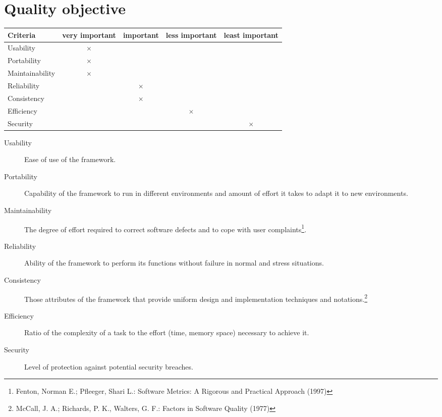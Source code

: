 \section{Quality objective}

\begin{tabular}{lcccc}
\hline
\textbf{Criteria} & \textbf{very important} & \textbf{important} & \textbf{less important} & \textbf{least important} \\
	\hline
	Usability & $\times$ & & & \\
	Portability & $\times$ & & & \\
	Maintainability & $\times$ & & & \\
	Reliability & & $\times$ & & \\
	Consistency & & $\times$ & & \\
	Efficiency & & & $\times$ & \\
	Security & & & & $\times$ \\
	\hline
\end{tabular}


\begin{description}
	\item[Usability] Ease of use of the framework.
	\item[Portability] Capability of the framework to run in different environments and amount of effort it takes to adapt it to new environments.
	\item[Maintainability] The degree of effort required to correct software defects and to cope with user complaints\footnote{Fenton, Norman E.; Pfleeger, Shari L.: Software Metrics: A Rigorous and Practical Approach (1997)}.
	\item[Reliability] Ability of the framework to perform its functions without failure in normal and stress situations.
	\item[Consistency] Those attributes of the framework that provide uniform design and implementation techniques and notations.\footnote{McCall, J. A.; Richards, P. K., Walters, G. F.: Factors in Software Quality (1977)}
	\item[Efficiency] Ratio of the complexity of a task to the effort (time, memory space) necessary to achieve it.
	\item[Security] Level of protection against potential security breaches.
	
\end{description}